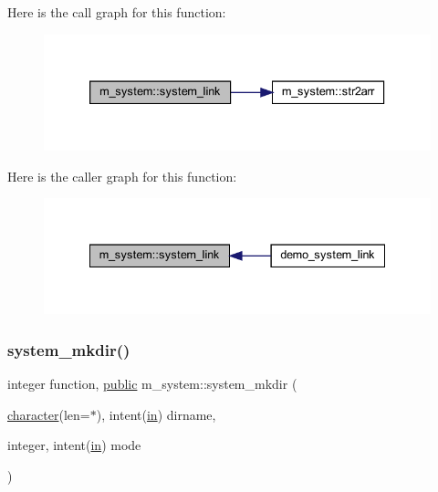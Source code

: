 Here is the call graph for this function\+:
\nopagebreak
\begin{figure}[H]
\begin{center}
\leavevmode
\includegraphics[width=333pt]{namespacem__system_aa77d9c9ae68750f515ba3d04d022c43c_cgraph}
\end{center}
\end{figure}
Here is the caller graph for this function\+:
\nopagebreak
\begin{figure}[H]
\begin{center}
\leavevmode
\includegraphics[width=335pt]{namespacem__system_aa77d9c9ae68750f515ba3d04d022c43c_icgraph}
\end{center}
\end{figure}
\mbox{\label{namespacem__system_a084d644c236d22af2cc75c6e48fd6e96}} 
\subsubsection{\texorpdfstring{system\+\_\+mkdir()}{system\_mkdir()}}
{\footnotesize\ttfamily integer function, \hyperlink{M__stopwatch_83_8txt_a2f74811300c361e53b430611a7d1769f}{public} m\+\_\+system\+::system\+\_\+mkdir (\begin{DoxyParamCaption}\item[{\hyperlink{option__stopwatch_83_8txt_abd4b21fbbd175834027b5224bfe97e66}{character}(len=$\ast$), intent(\hyperlink{M__journal_83_8txt_afce72651d1eed785a2132bee863b2f38}{in})}]{dirname,  }\item[{integer, intent(\hyperlink{M__journal_83_8txt_afce72651d1eed785a2132bee863b2f38}{in})}]{mode }\end{DoxyParamCaption})}



